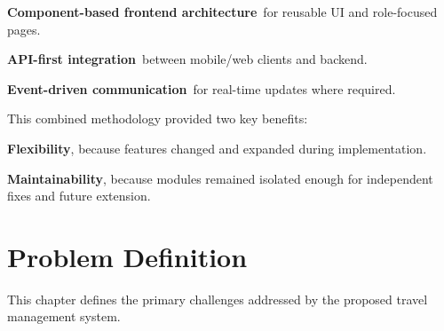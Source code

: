 \documentclass[12pt,a4paper]{article}
\newlength{\ThesisParagraphIndent}
\newcommand{\ThesisParagraph}[1]{%
  \par\begingroup
  \setlength{\leftskip}{\ThesisParagraphIndent}%
  \setlength{\parindent}{0pt}%
  \noindent#1\par
  \endgroup}
\begin{document}
\begin{list}{}{\setlength{\leftmargin}{\dimexpr\ThesisParagraphIndent+1.5em\relax}\setlength{\labelsep}{0.5em}\setlength{\topsep}{2pt}\setlength{\parsep}{0pt}}
\item[\textbullet] \textbf{Component-based frontend architecture}~for reusable UI and role-focused pages.
\end{list}


\begin{list}{}{\setlength{\leftmargin}{\dimexpr\ThesisParagraphIndent+1.5em\relax}\setlength{\labelsep}{0.5em}\setlength{\topsep}{2pt}\setlength{\parsep}{0pt}}
\item[\textbullet] \textbf{API-first integration}~between mobile/web clients and backend.
\end{list}


\begin{list}{}{\setlength{\leftmargin}{\dimexpr\ThesisParagraphIndent+1.5em\relax}\setlength{\labelsep}{0.5em}\setlength{\topsep}{2pt}\setlength{\parsep}{0pt}}
\item[\textbullet] \textbf{Event-driven communication}~for real-time updates where required.
\end{list}


\ThesisParagraph{This combined methodology provided two key benefits:}


\begin{list}{}{\setlength{\leftmargin}{\dimexpr\ThesisParagraphIndent+1.5em\relax}\setlength{\labelsep}{0.5em}\setlength{\topsep}{2pt}\setlength{\parsep}{0pt}}
\item[\textbullet] \textbf{Flexibility}, because features changed and expanded during implementation.
\end{list}


\begin{list}{}{\setlength{\leftmargin}{\dimexpr\ThesisParagraphIndent+1.5em\relax}\setlength{\labelsep}{0.5em}\setlength{\topsep}{2pt}\setlength{\parsep}{0pt}}
\item[\textbullet] \textbf{Maintainability}, because modules remained isolated enough for independent fixes and future extension.
\end{list}


\section{Problem Definition}

\ThesisParagraph{This chapter defines the primary challenges addressed by the proposed travel management system.}
\end{document}

